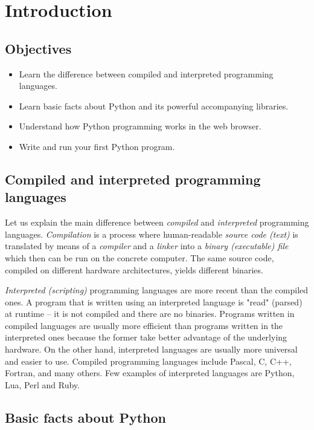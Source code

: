 \documentclass[article,A4,12pt]{llncs}
\begin{document}
\section{Introduction}

\subsection{Objectives}

\begin{itemize}
\item Learn the difference between compiled and interpreted programming languages.
\item Learn basic facts about Python and its powerful accompanying libraries.
\item Understand how Python programming works in the web browser.
\item Write and run your first Python program.
\end{itemize}

\subsection{Compiled and interpreted programming languages}

Let us explain the main difference between {\em compiled} and {\em interpreted} programming languages. 
{\em Compilation} is a process where human-readable {\em source code (text)} is translated by
means of a {\em compiler} and a {\em linker}
into a {\em binary (executable) file} which then can be run on the concrete computer. The same 
source code, compiled on different hardware architectures, yields different binaries. 

{\em Interpreted (scripting)} programming languages are more recent than the compiled ones. 
A program that is written using an interpreted language is "read" (parsed) at runtime -- it is 
not compiled and there are no binaries. Programs 
written in compiled languages are usually more efficient than programs written in the interpreted 
ones because the former take better advantage of the underlying hardware. On the other hand,
interpreted languages are usually more universal and easier to use. Compiled 
programming languages include Pascal, C, C++, Fortran, and many others. Few examples of interpreted 
languages are Python, Lua, Perl and Ruby. 

\subsection{Basic facts about Python}
\end{document}
